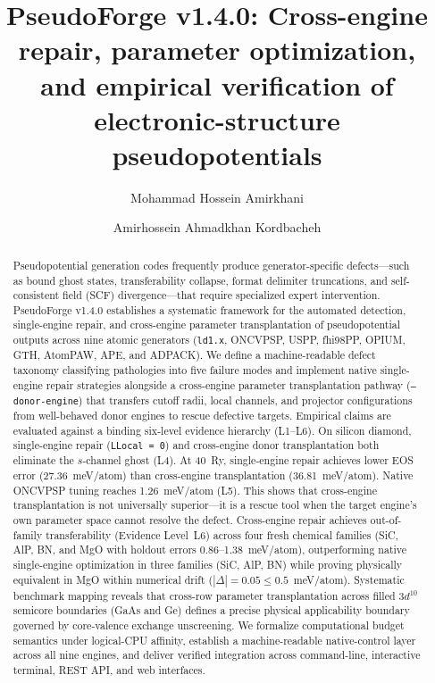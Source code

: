 \documentclass[3p,twocolumn]{elsarticle}
\begin{document}
\begin{frontmatter}
\title{PseudoForge v1.4.0: Cross-engine repair, parameter optimization, and empirical verification of electronic-structure pseudopotentials}
\author[iust]{Mohammad Hossein Amirkhani}
\author[iust]{Amirhossein Ahmadkhan Kordbacheh}

\begin{abstract}
Pseudopotential generation codes frequently produce generator-specific defects---such as bound ghost states, transferability collapse, format delimiter truncations, and self-consistent field (SCF) divergence---that require specialized expert intervention. PseudoForge v1.4.0 establishes a systematic framework for the automated detection, single-engine repair, and cross-engine parameter transplantation of pseudopotential outputs across nine atomic generators (\texttt{ld1.x}, ONCVPSP, USPP, fhi98PP, OPIUM, GTH, AtomPAW, APE, and ADPACK). We define a machine-readable defect taxonomy classifying pathologies into five failure modes and implement native single-engine repair strategies alongside a cross-engine parameter transplantation pathway (\texttt{--donor-engine}) that transfers cutoff radii, local channels, and projector configurations from well-behaved donor engines to rescue defective targets. Empirical claims are evaluated against a binding six-level evidence hierarchy (L1--L6). On silicon diamond, single-engine repair (\texttt{LLocal = 0}) and cross-engine donor transplantation both eliminate the $s$-channel ghost (L4). At 40~Ry, single-engine repair achieves lower EOS error (27.36~meV/atom) than cross-engine transplantation (36.81~meV/atom). Native ONCVPSP tuning reaches 1.26~meV/atom (L5). This shows that cross-engine transplantation is not universally superior---it is a rescue tool when the target engine's own parameter space cannot resolve the defect. Cross-engine repair achieves out-of-family transferability (Evidence Level~L6) across four fresh chemical families (SiC, AlP, BN, and MgO with holdout errors 0.86--1.38~meV/atom), outperforming native single-engine optimization in three families (SiC, AlP, BN) while proving physically equivalent in MgO within numerical drift ($|\Delta| = 0.05 \le 0.5$~meV/atom). Systematic benchmark mapping reveals that cross-row parameter transplantation across filled $3d^{10}$ semicore boundaries (GaAs and Ge) defines a precise physical applicability boundary governed by core-valence exchange unscreening. We formalize computational budget semantics under logical-CPU affinity, establish a machine-readable native-control layer across all nine engines, and deliver verified integration across command-line, interactive terminal, REST API, and web interfaces.
\end{abstract}


\end{frontmatter}
\end{document}
